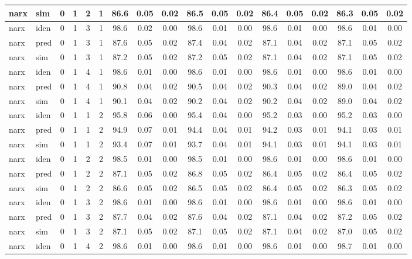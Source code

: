 \begin{landscape}
\begin{center}
\begin{longtable}{ll|cccc|ccc|ccc|ccc|ccc}
narx & sim  & 0 & 1 & 2 & 1 & 86.6 & 0.05 & 0.02 & 86.5 & 0.05 & 0.02 & 86.4 & 0.05 & 0.02 & 86.3 & 0.05 & 0.02 \\ 
 \hline 
narx & iden & 0 & 1 & 3 & 1 & 98.6 & 0.02 & 0.00 & 98.6 & 0.01 & 0.00 & 98.6 & 0.01 & 0.00 & 98.6 & 0.01 & 0.00 \\ 
narx & pred & 0 & 1 & 3 & 1 & 87.6 & 0.05 & 0.02 & 87.4 & 0.04 & 0.02 & 87.1 & 0.04 & 0.02 & 87.1 & 0.05 & 0.02 \\ 
narx & sim  & 0 & 1 & 3 & 1 & 87.2 & 0.05 & 0.02 & 87.2 & 0.05 & 0.02 & 87.1 & 0.04 & 0.02 & 87.1 & 0.05 & 0.02 \\ 
 \hline 
narx & iden & 0 & 1 & 4 & 1 & 98.6 & 0.01 & 0.00 & 98.6 & 0.01 & 0.00 & 98.6 & 0.01 & 0.00 & 98.6 & 0.01 & 0.00 \\ 
narx & pred & 0 & 1 & 4 & 1 & 90.8 & 0.04 & 0.02 & 90.5 & 0.04 & 0.02 & 90.3 & 0.04 & 0.02 & 89.0 & 0.04 & 0.02 \\ 
narx & sim  & 0 & 1 & 4 & 1 & 90.1 & 0.04 & 0.02 & 90.2 & 0.04 & 0.02 & 90.2 & 0.04 & 0.02 & 89.0 & 0.04 & 0.02 \\ 
 \hline 
narx & iden & 0 & 1 & 1 & 2 & 95.8 & 0.06 & 0.00 & 95.4 & 0.04 & 0.00 & 95.2 & 0.03 & 0.00 & 95.2 & 0.03 & 0.00 \\ 
narx & pred & 0 & 1 & 1 & 2 & 94.9 & 0.07 & 0.01 & 94.4 & 0.04 & 0.01 & 94.2 & 0.03 & 0.01 & 94.1 & 0.03 & 0.01 \\ 
narx & sim  & 0 & 1 & 1 & 2 & 93.4 & 0.07 & 0.01 & 93.7 & 0.04 & 0.01 & 94.1 & 0.03 & 0.01 & 94.1 & 0.03 & 0.01 \\ 
 \hline 
narx & iden & 0 & 1 & 2 & 2 & 98.5 & 0.01 & 0.00 & 98.5 & 0.01 & 0.00 & 98.6 & 0.01 & 0.00 & 98.6 & 0.01 & 0.00 \\ 
narx & pred & 0 & 1 & 2 & 2 & 87.1 & 0.05 & 0.02 & 86.8 & 0.05 & 0.02 & 86.4 & 0.05 & 0.02 & 86.4 & 0.05 & 0.02 \\ 
narx & sim  & 0 & 1 & 2 & 2 & 86.6 & 0.05 & 0.02 & 86.5 & 0.05 & 0.02 & 86.4 & 0.05 & 0.02 & 86.3 & 0.05 & 0.02 \\ 
 \hline 
narx & iden & 0 & 1 & 3 & 2 & 98.6 & 0.01 & 0.00 & 98.6 & 0.01 & 0.00 & 98.6 & 0.01 & 0.00 & 98.6 & 0.01 & 0.00 \\ 
narx & pred & 0 & 1 & 3 & 2 & 87.7 & 0.04 & 0.02 & 87.6 & 0.04 & 0.02 & 87.1 & 0.04 & 0.02 & 87.2 & 0.05 & 0.02 \\ 
narx & sim  & 0 & 1 & 3 & 2 & 87.1 & 0.05 & 0.02 & 87.1 & 0.05 & 0.02 & 87.1 & 0.04 & 0.02 & 87.0 & 0.05 & 0.02 \\ 
 \hline 
narx & iden & 0 & 1 & 4 & 2 & 98.6 & 0.01 & 0.00 & 98.6 & 0.01 & 0.00 & 98.6 & 0.01 & 0.00 & 98.7 & 0.01 & 0.00 \\ 

\end{longtable}
\end{center}
\end{landscape}
